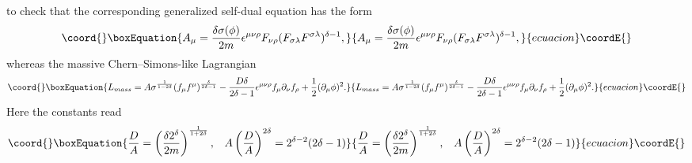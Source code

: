 \documentclass[a4 paper, 12 pt] {article}
\begin{document}
to check that the corresponding generalized self-dual equation has the
form
\begin{equation}\coord{}\boxEquation{
A_{\mu } = \frac{\delta \sigma (\phi ) }{2m} \epsilon^{\mu \nu \rho }
F_{\nu
\rho } (F_{\sigma \lambda }F^{\sigma \lambda } )^{\delta -1}
,
\label{dualmassivedyl}
}{
A_{\mu } = \frac{\delta \sigma (\phi ) }{2m} \epsilon^{\mu \nu \rho }
F_{\nu
\rho } (F_{\sigma \lambda }F^{\sigma \lambda } )^{\delta -1}
,
}{ecuacion}\coordE{}\end{equation}
whereas the massive Chern--Simons-like Lagrangian
\begin{equation}\coord{}\boxEquation{
L_{mass}= A \sigma^{\frac{1}{1-2\delta }} (f_{\mu} f^{\mu}
)^{\frac{\delta }{2
\delta -1}} -
\frac{D \delta }{2\delta -1}
\epsilon^{\mu \nu \rho } f_{\mu } \partial_{\nu } f_{\rho }
+\frac{1}{2} (\partial_{\mu } \phi )^2.
\label{procamassivedyl}
}{
L_{mass}= A \sigma^{\frac{1}{1-2\delta }} (f_{\mu} f^{\mu}
)^{\frac{\delta }{2
\delta -1}} -
\frac{D \delta }{2\delta -1}
\epsilon^{\mu \nu \rho } f_{\mu } \partial_{\nu } f_{\rho }
+\frac{1}{2} (\partial_{\mu } \phi )^2.
}{ecuacion}\coordE{}\end{equation}
Here the constants read
\begin{equation}\coord{}\boxEquation{
\frac{D}{A}=\left(\frac{\delta 2^{\delta }}{2m}
\right)^{\frac{1}{1+2\delta }}, \; \; \;
A \left(\frac{D}{A} \right)^{2 \delta }=2^{\delta -2} (2\delta -1)
\label{const2}
}{
\frac{D}{A}=\left(\frac{\delta 2^{\delta }}{2m}
\right)^{\frac{1}{1+2\delta }}, \; \; \;
A \left(\frac{D}{A} \right)^{2 \delta }=2^{\delta -2} (2\delta -1)
}{ecuacion}\coordE{}\end{equation}
\end{document}

